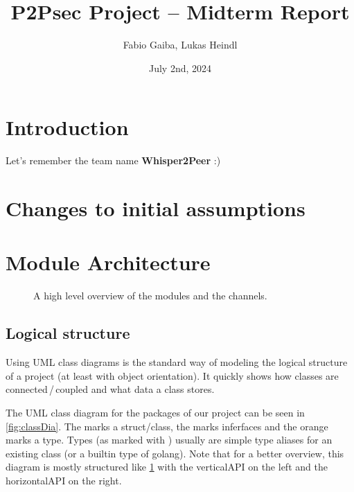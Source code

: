 \documentclass[a4paper,english,10pt,NET]{tumarticle}
\title{P2Psec Project -- Midterm Report}
\author{Fabio Gaiba, Lukas Heindl}
\date{July 2nd, 2024}
\begin{document}
\maketitle
\thispagestyle{tumarticle}

\section{Introduction}

Let's remember the team name \textbf{Whisper2Peer} :)


\section{Changes to initial assumptions}


\section{Module Architecture}

\begin{figure}
	\centering
	
	\caption{A high level overview of the modules and the channels.}
	\label{fig:overview}
\end{figure}

\subsection{Logical structure}
Using UML class diagrams is the standard way of modeling the logical structure of a project (at least with object orientation).
It quickly shows how classes are connected\,/\,coupled and what data a class stores.

The UML class diagram for the packages of our project can be seen in \cref{fig:classDia}.
The  marks a struct/class, the  marks inferfaces and the orange  marks a type.
Types (as marked with ) usually are simple type aliases for an existing class (or a builtin type of golang).
Note that for a better overview, this diagram is mostly structured like \cref{fig:overview} with the verticalAPI on the left and the horizontalAPI on the right.
\end{document}
